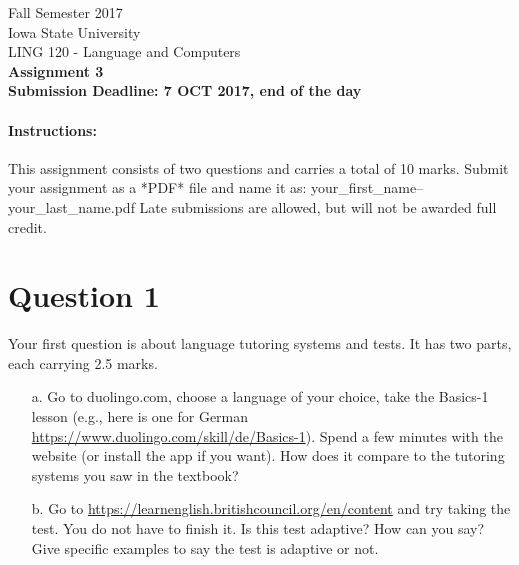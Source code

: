 \documentclass[11pt,a4paper]{article}
\begin{document}
\begin{center}
  Fall Semester 2017 \\ Iowa State University\\[3ex]
  {\large LING 120 - Language and Computers}\\[3ex]
  \textbf{Assignment 3} \\ \textbf{Submission Deadline: 7 OCT 2017, end of the day}
\end{center}

\paragraph{Instructions:} This assignment consists of two questions and carries a total of 10 marks. Submit your assignment as a *PDF* file and name it as: your\_first\_name--your\_last\_name.pdf Late submissions are allowed, but will not be awarded full credit.

\section*{Question 1}
Your first question is about language tutoring systems and tests. It has two parts, each carrying 2.5 marks.
\begin{enumerate}
\item[a.] Go to duolingo.com, choose a language of your choice, take the Basics-1 lesson (e.g., here is one for German \url{https://www.duolingo.com/skill/de/Basics-1}). Spend a few minutes with the website (or install the app if you want). How does it compare to the tutoring systems you saw in the textbook? 
\item[b.] Go to \url{https://learnenglish.britishcouncil.org/en/content} and try taking the test. You do not have to finish it. Is this test adaptive? How can you say? Give specific examples to say the test is adaptive or not. 
\end{enumerate}
\end{document}
